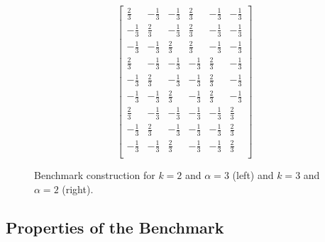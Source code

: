 \begin{figure*}[h]
\begin{center}
$$\begin{bmatrix}
 \frac{2}{3}   & -\frac{1}{3}  & -\frac{1}{3} & \frac{2}{3}   & -\frac{1}{3}  & -\frac{1}{3}   \\
 -\frac{1}{3}  & \frac{2}{3}   & -\frac{1}{3} & \frac{2}{3}   & -\frac{1}{3}  & -\frac{1}{3}   \\
 -\frac{1}{3}  & -\frac{1}{3}  & \frac{2}{3}  & \frac{2}{3}   & -\frac{1}{3}  & -\frac{1}{3}   \\
 \frac{2}{3}   & -\frac{1}{3}  & -\frac{1}{3} & -\frac{1}{3}  & \frac{2}{3}   & -\frac{1}{3}   \\
 -\frac{1}{3}  & \frac{2}{3}   & -\frac{1}{3} & -\frac{1}{3}  & \frac{2}{3}   & -\frac{1}{3}   \\
 -\frac{1}{3}  & -\frac{1}{3}  & \frac{2}{3}  & -\frac{1}{3}  & \frac{2}{3}   &  -\frac{1}{3}  \\
 \frac{2}{3}   & -\frac{1}{3}  & -\frac{1}{3} & -\frac{1}{3}  & -\frac{1}{3}  & \frac{2}{3}    \\
 -\frac{1}{3}  & \frac{2}{3}   & -\frac{1}{3} & -\frac{1}{3}  & -\frac{1}{3}  & \frac{2}{3}    \\
 -\frac{1}{3}  & -\frac{1}{3}  & \frac{2}{3}  & -\frac{1}{3}  & -\frac{1}{3}  & \frac{2}{3}    \\
\end{bmatrix} 
$$
\end{center}
\label{fig1}
\caption{Benchmark construction for $k=2$ and $\alpha=3$ (left) and $k=3$ and $\alpha=2$ (right).}
\end{figure*}

\subsection{Properties of the Benchmark}

